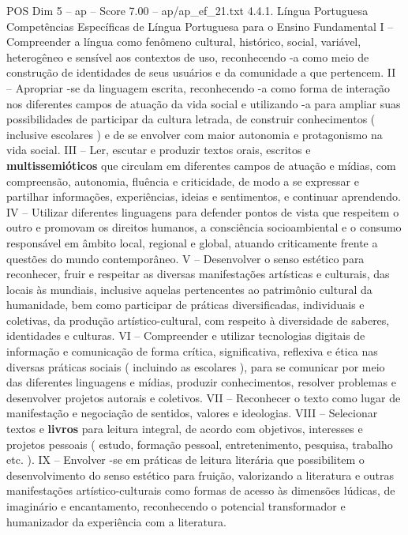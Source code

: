 \begin{textsample}{POS Dim 5 – ap – Score 7.00 – ap/ap\_ef\_21.txt}  \label{ex:f5_pos_163}
4.4.1.
Língua Portuguesa Competências Específicas de Língua Portuguesa para o Ensino Fundamental I – Compreender a língua como fenômeno cultural, histórico, social, variável, heterogêneo e sensível aos contextos de uso, reconhecendo -a como meio de construção de identidades de seus usuários e da comunidade a que pertencem.
II – Apropriar -se da linguagem escrita, reconhecendo -a como forma de interação nos diferentes campos de atuação da vida social e utilizando -a para ampliar suas possibilidades de participar da cultura letrada, de construir conhecimentos ( inclusive escolares ) e de se envolver com maior autonomia e protagonismo na vida social.
III – Ler, escutar e produzir textos orais, escritos e \textbf{multissemióticos} que circulam em diferentes campos de atuação e mídias, com compreensão, autonomia, fluência e criticidade, de modo a se expressar e partilhar informações, experiências, ideias e sentimentos, e continuar aprendendo.
IV – Utilizar diferentes linguagens para defender pontos de vista que respeitem o outro e promovam os direitos humanos, a consciência socioambiental e o consumo responsável em âmbito local, regional e global, atuando criticamente frente a questões do mundo contemporâneo.
V – Desenvolver o senso estético para reconhecer, fruir e respeitar as diversas manifestações artísticas e culturais, das locais às mundiais, inclusive aquelas pertencentes ao patrimônio cultural da humanidade, bem como participar de práticas diversificadas, individuais e coletivas, da produção artístico-cultural, com respeito à diversidade de saberes, identidades e culturas.
VI – Compreender e utilizar tecnologias digitais de informação e comunicação de forma crítica, significativa, reflexiva e ética nas diversas práticas sociais ( incluindo as escolares ), para se comunicar por meio das diferentes linguagens e mídias, produzir conhecimentos, resolver problemas e desenvolver projetos autorais e coletivos.
VII – Reconhecer o texto como lugar de manifestação e negociação de sentidos, valores e ideologias.
VIII – Selecionar textos e \textbf{livros} para leitura integral, de acordo com objetivos, interesses e projetos pessoais ( estudo, formação pessoal, entretenimento, pesquisa, trabalho etc. ).
IX – Envolver -se em práticas de leitura literária que possibilitem o desenvolvimento do senso estético para fruição, valorizando a literatura e outras manifestações artístico-culturais como formas de acesso às dimensões lúdicas, de imaginário e encantamento, reconhecendo o potencial transformador e humanizador da experiência com a literatura.

\end{textsample}
